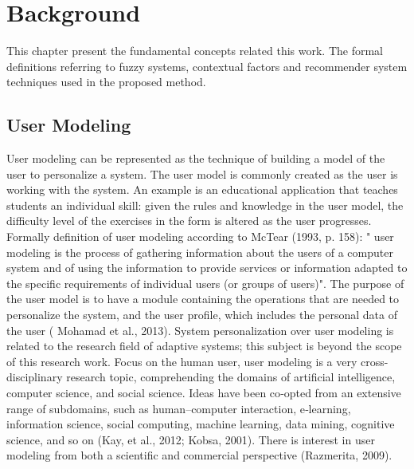 
\chapter{Background}

This chapter present the fundamental concepts related this work. The
formal definitions referring to fuzzy systems, contextual factors and
recommender system techniques used in the proposed method.
\section{User Modeling}


User modeling can be represented as the technique of building a model of the
user to personalize a system. The user model is commonly created as the user is
working with the system. An example is an educational application that teaches
students an individual skill: given the rules and knowledge in the user model,
the difficulty level of the exercises in the form is altered as the user
progresses.   Formally definition of user modeling according to McTear (1993, p.
158): " user modeling is the process of gathering information about the users of
a computer system and of using the information to provide services or
information adapted to the specific requirements of individual users (or groups
of users)". The purpose of the user model is to have a module containing the
operations that are needed to personalize the system, and the user profile,
which includes the personal data of the user ( Mohamad et al., 2013).    System
personalization over user modeling is related to the research field of adaptive
systems; this subject is beyond the scope of this research work. Focus on the
human user, user modeling is a very cross-disciplinary research topic,
comprehending the domains of artificial intelligence, computer science, and
social science. Ideas have been co‐opted from an extensive range of subdomains,
such as human–computer interaction, e‐learning, information science, social
computing, machine learning, data mining, cognitive science, and so on (Kay, et
al., 2012; Kobsa, 2001). There is interest in user modeling from both a
scientific and commercial perspective (Razmerita, 2009).

